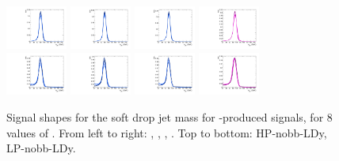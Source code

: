 \begin{figure}[htbp]
  \centering
  \includegraphics[width=0.18\textwidth]{fig/2Dfit/templateSignalVsMX_fromDC_VBFGbuToWW_MJJ_mu_HP_nobb_LDy.pdf}
  \includegraphics[width=0.18\textwidth]{fig/2Dfit/templateSignalVsMX_fromDC_VBFRadToWW_MJJ_mu_HP_nobb_LDy.pdf}
  \includegraphics[width=0.18\textwidth]{fig/2Dfit/templateSignalVsMX_fromDC_VBFZprToWW_MJJ_mu_HP_nobb_LDy.pdf}
  \includegraphics[width=0.18\textwidth]{fig/2Dfit/templateSignalVsMX_fromDC_VBFWprToWZ_MJJ_mu_HP_nobb_LDy.pdf}\\
  \includegraphics[width=0.18\textwidth]{fig/2Dfit/templateSignalVsMX_fromDC_VBFGbuToWW_MJJ_mu_LP_nobb_LDy.pdf}
  \includegraphics[width=0.18\textwidth]{fig/2Dfit/templateSignalVsMX_fromDC_VBFRadToWW_MJJ_mu_LP_nobb_LDy.pdf}
  \includegraphics[width=0.18\textwidth]{fig/2Dfit/templateSignalVsMX_fromDC_VBFZprToWW_MJJ_mu_LP_nobb_LDy.pdf}
  \includegraphics[width=0.18\textwidth]{fig/2Dfit/templateSignalVsMX_fromDC_VBFWprToWZ_MJJ_mu_LP_nobb_LDy.pdf}\\
  \caption{
    Signal shapes for the soft drop jet mass \MJ for \VBF-produced signals, for 8 values of \MX.
    From left to right: \GBulktoWW, \RadtoWW, \ZprtoWW, \WprtoWZ.
    Top to bottom: HP-nobb-LDy, LP-nobb-LDy.
  }
  \label{fig:MJJShapes_VBF_LDy_Run2}
\end{figure}

